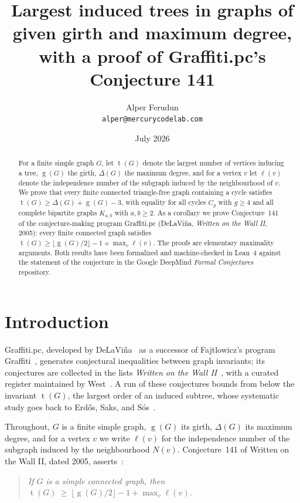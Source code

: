 \documentclass[11pt]{article}
\title{Largest induced trees in graphs of given girth and maximum degree,\\
with a proof of Graffiti.pc's Conjecture 141}
\author{Alper Ferudun\\\texttt{alper@mercurycodelab.com}}
\date{July 2026}
\numberwithin{equation}{section}
\theoremstyle{remark}
\newcommand{\tr}{\operatorname{t}}
\newcommand{\gr}{\operatorname{g}}
\newcommand{\lv}{\ell}
\begin{document}
\maketitle

\begin{abstract}
For a finite simple graph $G$, let $\tr(G)$ denote the largest number of
vertices inducing a tree, $\gr(G)$ the girth, $\Delta(G)$ the maximum degree,
and for a vertex $v$ let $\lv(v)$ denote the independence number of the
subgraph induced by the neighbourhood of $v$.  We prove that every finite
connected triangle-free graph containing a cycle satisfies
$\tr(G)\ge\Delta(G)+\gr(G)-3$, with equality for all cycles $C_g$ with
$g\ge4$ and all complete bipartite graphs $K_{a,b}$ with $a,b\ge2$.  As a corollary we prove Conjecture~141 of the
conjecture-making program Graffiti.pc (DeLaVi\~na, \emph{Written on the Wall
II}, 2005): every finite connected graph satisfies
$\tr(G)\ge\lfloor\gr(G)/2\rfloor-1+\max_v\lv(v)$.  The proofs are elementary
maximality arguments.  Both results have been formalized and machine-checked
in Lean~4 against the statement of the conjecture in the Google DeepMind
\emph{Formal Conjectures} repository.
\end{abstract}

\section{Introduction}

Graffiti.pc, developed by DeLaVi\~na~\cite{DeL01,DeLhistory} as a successor of
Fajtlowicz's program Graffiti~\cite{Faj88}, generates conjectural inequalities
between graph invariants; its conjectures are collected in the lists
\emph{Written on the Wall II}~\cite{WOWII}, with a curated register maintained
by West~\cite{WestReg}.  A run of these conjectures bounds from below the
invariant $\tr(G)$, the largest order of an induced subtree, whose systematic
study goes back to Erd\H{o}s, Saks, and S\'os~\cite{ESS86}.

Throughout, $G$ is a finite simple graph, $\gr(G)$ its girth, $\Delta(G)$ its
maximum degree, and for a vertex $v$ we write
$\lv(v)$ for the independence number of the subgraph induced by the
neighbourhood $N(v)$.  Conjecture~141 of Written on the Wall II, dated 2005,
asserts~\cite{WestReg,WOWII}:

\begin{quote}
\emph{If $G$ is a simple connected graph, then
$\tr(G)\ \ge\ \lfloor \gr(G)/2\rfloor - 1 + \max_v \lv(v)$.}
\end{quote}
\end{document}
